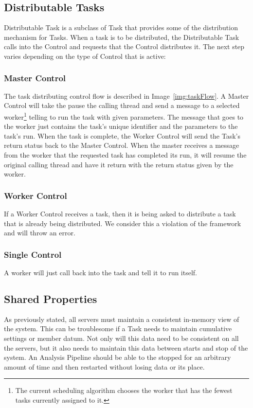 \documentclass[12pt]{ucthesis}
\begin{document}
\subsection{Distributable Tasks}
\label{arch-dist-tasks}
Distributable Task is a subclass of Task that provides some of the distribution mechanism for Tasks.
When a task is to be distributed, the Distributable Task calls into the Control and requests that
the Control distributes it. The next step varies depending on the type of Control that is active:

\subsubsection{Master Control}
The task distributing control flow is described in Image~\ref{img:taskFlow}.
A Master Control will take the pause the calling thread and send a message to a selected worker\footnote{The
current scheduling algorithm chooses the worker that has the fewest tasks currently assigned to it.} telling to
run the task with given parameters. The message that goes to the worker just contains the task's unique identifier
and the parameters to the task's run. When the task is complete, the Worker Control will send the Task's return
status back to the Master Control. When the master receives a message from the worker that the requested task
has completed its run, it will resume the original calling thread and have it return with the return status given
by the worker.

\subsubsection{Worker Control}
If a Worker Control receives a task, then it is being asked to distribute a task that is already being distributed.
We consider this a violation of the framework and will throw an error.

\subsubsection{Single Control}
A worker will just call back into the task and tell it to run itself.

\subsection{Shared Properties}
\label{arch-props}
As previously stated, all servers must maintain a consistent in-memory view of the system.
This can be troublesome if a Task needs to maintain cumulative settings or member datum.
Not only will this data need to be consistent on all the servers, but it also needs to maintain this
data between starts and stop of the system. An Analysis Pipeline should be able to the stopped for an arbitrary amount
of time and then restarted without losing data or its place.
\end{document}
